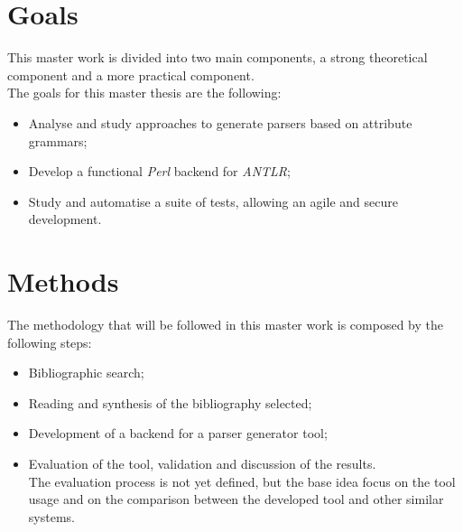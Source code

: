 \documentclass[a4paper,12pt]{article}
\begin{document}
\section{\Large Goals}
This master work is divided into two main components, a strong theoretical component and a more practical component.\\[6pt]
The goals for this master thesis are the following:
\begin{itemize}
\item Analyse and study approaches to generate parsers based on attribute grammars;
\item Develop a functional \emph{Perl} backend for \emph{ANTLR};
\item Study and automatise a suite of tests, allowing an agile and secure development.
\end{itemize}
\section{\Large Methods}
The methodology that will be followed in this master work is composed by the following steps:

\begin{itemize}
\item Bibliographic search;
\item Reading and synthesis of the bibliography selected;
\item Development of a backend for a parser generator tool;
\item Evaluation of the tool, validation and discussion of the results.\\[6pt]
The evaluation process is not yet defined, but the base idea focus on the tool usage and on the comparison between the developed tool and other similar systems.
\end{itemize}
\end{document}

